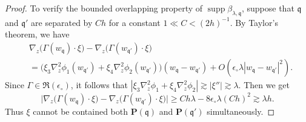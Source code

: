 \documentclass[10pt,a4paper]{amsart}
\newcommand{\fq}{\mathfrak q}
\DeclareMathOperator{\supp}{supp}
\begin{document}
\begin{proof}
To verify the bounded overlapping property of $\supp \beta_{\lambda,\fq}$, suppose that $\fq$ and $\fq'$ are separated by $C h$ for a constant $ 1 \ll C <(2h)^{-1}$. 
By Taylor's theorem, we have  
\begin{align*}
&\nabla_{z} \big(\Gamma(w_{\fq}) \cdot \xi\big)
-\nabla_{z} \big(\Gamma(w_{\fq'}) \cdot \xi \big)\\
& =\big(\xi_3 \nabla_z^2\phi_1(w_{\fq'})+\xi_4 \nabla_z^2\phi_2(w_{\fq'} )\big)(w_\fq-w_{\fq'}) + O( \epsilon_\circ \lambda |w_\fq -w_{\fq'}|^2).
\end{align*}
Since $\Gamma\in \mathfrak R(\epsilon_\circ)$, it follows that $ | \xi_3 \nabla_z^2\phi_1+\xi_4 \nabla_z^2\phi_2| \gtrsim |\xi''| \gtrsim \lambda $.
Then we get 
\begin{equation*}
\big|\nabla_{z} \big(\Gamma(w_{\fq}) \cdot \xi\big)
-\nabla_{z} \big(\Gamma(w_{\fq'}) \cdot \xi \big) \big|
\ge C h \lambda -   8\epsilon_\circ \lambda (Ch)^2  
\gtrsim \lambda h.  
\end{equation*}
Thus $\xi$ cannot be contained both $\mathbf P(\fq)$ and $\mathbf P(\fq')$ simultaneously. 
\end{proof}
\end{document}

